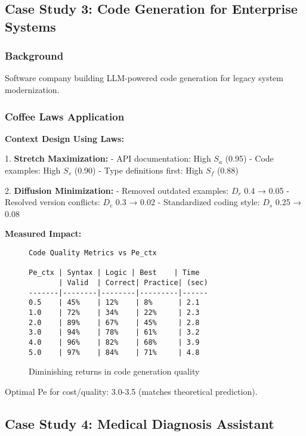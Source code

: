\documentclass[conference]{IEEEtran}
\begin{document}
\subsection{Case Study 3: Code Generation for Enterprise Systems}

\subsubsection{Background}

Software company building LLM-powered code generation for legacy system modernization.

\subsubsection{Coffee Laws Application}

\textbf{Context Design Using Laws:}

1. \textbf{Stretch Maximization:}
   - API documentation: High $S_a$ (0.95)
   - Code examples: High $S_s$ (0.90)
   - Type definitions first: High $S_f$ (0.88)

2. \textbf{Diffusion Minimization:}
   - Removed outdated examples: $D_r$ 0.4 → 0.05
   - Resolved version conflicts: $D_c$ 0.3 → 0.02
   - Standardized coding style: $D_s$ 0.25 → 0.08

\textbf{Measured Impact:}

\begin{figure}[h]
\centering
\begin{lstlisting}[basicstyle=\small]
Code Quality Metrics vs Pe_ctx

Pe_ctx | Syntax | Logic | Best    | Time
       | Valid  | Correct| Practice| (sec)
-------|--------|--------|---------|------
0.5    | 45%    | 12%    | 8%      | 2.1
1.0    | 72%    | 34%    | 22%     | 2.3
2.0    | 89%    | 67%    | 45%     | 2.8
3.0    | 94%    | 78%    | 61%     | 3.2
4.0    | 96%    | 82%    | 68%     | 3.9
5.0    | 97%    | 84%    | 71%     | 4.8
\end{lstlisting}
\caption{Diminishing returns in code generation quality}
\end{figure}

Optimal Pe for cost/quality: 3.0-3.5 (matches theoretical prediction).

\subsection{Case Study 4: Medical Diagnosis Assistant}
\end{document}
